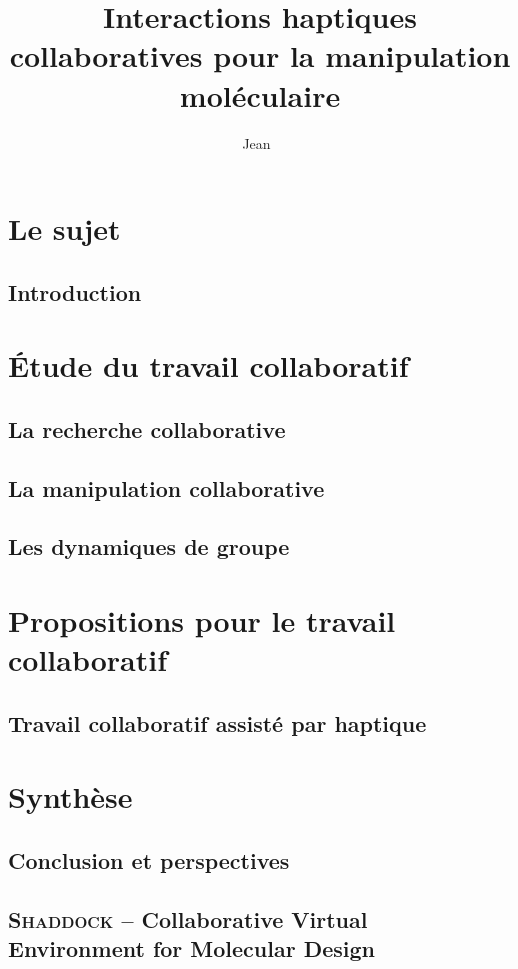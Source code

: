 \documentclass[myfrancais]{mythesis}
\title{Interactions haptiques collaboratives pour la manipulation moléculaire}
\author{Jean~\name{Simard}}
\date{\mydate[datestyle=long]{01/12/2011}}
\newcommand{\acro}[1]{\textsc{#1}}
\begin{document}
	\frontmatter
	\maketitle
	\mytoc
	\mylof
	\mylot
	\mylotodo
	\mainmatter
	\part{Le sujet}
	\chapter{Introduction}
	\part{Étude du travail collaboratif}
	\chapter{La recherche collaborative}
	\chapter{La manipulation collaborative}
	\chapter{Les dynamiques de groupe}
	\part{Propositions pour le travail collaboratif}
	\chapter{Travail collaboratif assisté par haptique}
	\part{Synthèse}
	\chapter{Conclusion et perspectives}

	\appendix
	\chapter{\acro{Shaddock} -- Collaborative Virtual Environment for Molecular Design}
\end{document}
